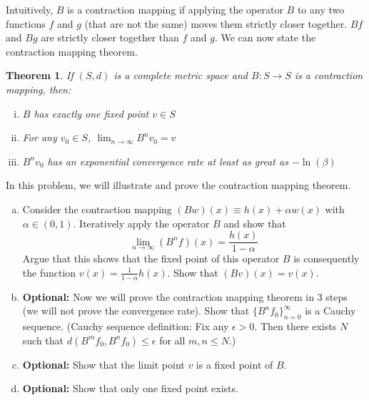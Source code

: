 \documentclass[11pt]{extarticle}
\theoremstyle{plain}
\newtheorem{thm}{Theorem}
\theoremstyle{definition}
\begin{document}
\vspace{5mm}
\noindent
Intuitively, $B$ is a contraction mapping if applying the operator $B$ to any two functions $f$ and $g$ (that are not the same) moves them strictly closer together. $Bf$ and $Bg$ are strictly closer together than $f$ and $g$. We can now state the contraction mapping theorem. 


\vspace{5mm}
\begin{thm}

	If $(S, d)$ is a complete metric space and $B: S \to S$ is a contraction mapping, then: 
	\begin{enumerate}[(i)]
		\item $B$ has exactly one fixed point $v \in S$
		\item For any $v_0 \in S$, $\lim_{n \to \infty} B^n v_0 = v$
		\item $B^n v_0$ has an exponential convergence rate at least as great as $- \ln(\beta)$
	\end{enumerate}
	
\end{thm}


\vspace{5mm}
\noindent
In this problem, we will illustrate and prove the contraction mapping theorem.

\begin{enumerate}[(a)]
\item Consider the contraction mapping $(Bw)(x) \equiv h(x) + \alpha w(x)$ with $\alpha \in (0, 1)$. Iteratively apply the operator $B$ and show that 
\begin{equation*}
	\lim_{n \to \infty} (B^n f)(x) = \frac{h(x)}{1-\alpha}
\end{equation*}
Argue that this shows that the fixed point of this operator $B$ is consequently the function $v(x) = \frac{1}{1-\alpha} h(x)$. Show that $(Bv)(x) = v(x)$. 

\item \textbf{Optional:} Now we will prove the contraction mapping theorem in 3 steps (we will not prove the convergence rate). Show that $\{ B^n f_0\}_{n=0}^\infty$ is a Cauchy sequence. (Cauchy sequence definition: Fix any $\epsilon > 0$. Then there exists $N$ such that $d(B^m f_0, B^n f_0) \leq \epsilon$ for all $m, n \leq N$.) 

\item \textbf{Optional:} Show that the limit point $v$ is a fixed point of $B$. 

\item \textbf{Optional:} Show that only one fixed point exists. 

\end{enumerate}
\end{document}
